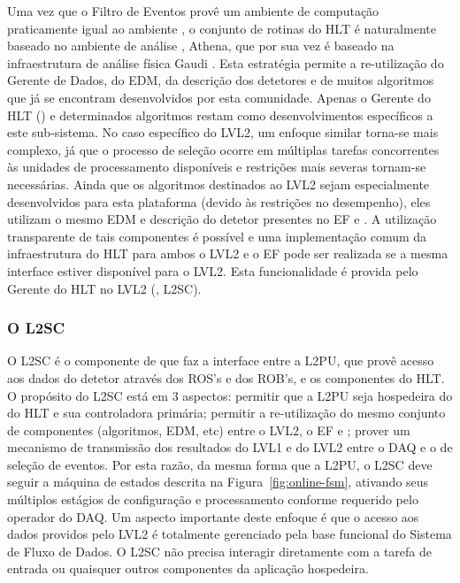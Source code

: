 Uma vez que o Filtro de Eventos provê um ambiente de computação praticamente
igual ao ambiente , o conjunto de rotinas do HLT é naturalmente
baseado no ambiente de análise , Athena, que por sua vez é
baseado na infraestrutura de análise física Gaudi \cite{athena:home-page,
athena:devel-guide}. Esta estratégia permite a re-utilização do Gerente de
Dados, do EDM, da descrição dos detetores e de muitos algoritmos que já se
encontram desenvolvidos por esta comunidade. Apenas o Gerente do HLT
() e determinados algoritmos restam como desenvolvimentos
específicos a este sub-sistema. No caso específico do LVL2, um enfoque similar
torna-se mais complexo, já que o processo de seleção ocorre em múltiplas
tarefas concorrentes às unidades de processamento disponíveis e restrições
mais severas tornam-se necessárias. Ainda que os algoritmos destinados ao LVL2
sejam especialmente desenvolvidos para esta plataforma (devido às restrições
no desempenho), eles utilizam o mesmo EDM e descrição do detetor presentes no
EF e . A utilização transparente de tais componentes é possível e
uma implementação comum da infraestrutura do HLT para ambos o LVL2 e o EF pode
ser realizada se a mesma interface estiver disponível para o LVL2. Esta
funcionalidade é provida pelo Gerente do HLT no LVL2 (, L2SC).

\subsubsection{O L2SC}

O L2SC é o componente de  que faz a interface entre a L2PU, que
provê acesso aos dados do detetor através dos ROS's e dos ROB's, e os
componentes do HLT. O propósito do L2SC está em 3 aspectos: permitir que a
L2PU seja hospedeira do  do HLT e sua controladora primária;
permitir a re-utilização do mesmo conjunto de componentes (algoritmos, EDM,
etc) entre o LVL2, o EF e ; prover um mecanismo de transmissão
dos resultados do LVL1 e do LVL2 entre o DAQ e o  de seleção de
eventos. Por esta razão, da mesma forma que a L2PU, o L2SC deve seguir a
máquina de estados descrita na Figura~\ref{fig:online-fsm}, ativando seus
múltiplos estágios de configuração e processamento conforme requerido pelo
operador do DAQ. Um aspecto importante deste enfoque é que o acesso aos dados
providos pelo LVL2 é totalmente gerenciado pela base funcional do Sistema de
Fluxo de Dados. O L2SC não precisa interagir diretamente com a tarefa de
entrada ou quaisquer outros componentes da aplicação hospedeira.

